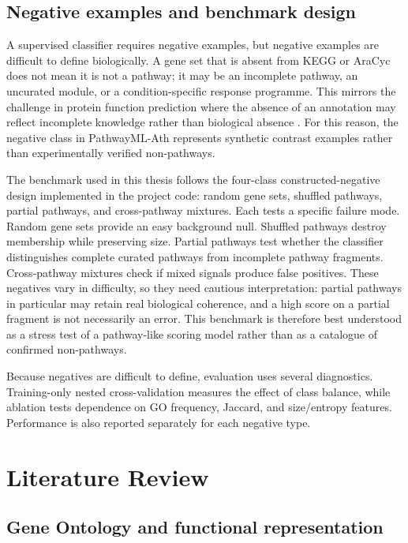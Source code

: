 \documentclass[12pt,letterpaper,oneside,openany]{book}
\begin{document}
\section{Negative examples and benchmark design}
\label{sec:bg_negatives}

A supervised classifier requires negative examples, but negative examples are difficult to define biologically. A gene set that is absent from KEGG or AraCyc does not mean it is not a pathway; it may be an incomplete pathway, an uncurated module, or a condition-specific response programme. This mirrors the challenge in protein function prediction where the absence of an annotation may reflect incomplete knowledge rather than biological absence \citep{radivojac2013community}. For this reason, the negative class in PathwayML-Ath represents synthetic contrast examples rather than experimentally verified non-pathways.

The benchmark used in this thesis follows the four-class constructed-negative design implemented in the project code: random gene sets, shuffled pathways, partial pathways, and cross-pathway mixtures. Each tests a specific failure mode. Random gene sets provide an easy background null. Shuffled pathways destroy membership while preserving size. Partial pathways test whether the classifier distinguishes complete curated pathways from incomplete pathway fragments. Cross-pathway mixtures check if mixed signals produce false positives. 
These negatives vary in difficulty, so they need cautious interpretation: partial pathways in particular may retain real biological coherence, and a high score on a partial fragment is not necessarily an error. This benchmark is therefore best understood as a stress test of a pathway-like scoring model rather than as a catalogue of confirmed non-pathways.

Because negatives are difficult to define, evaluation uses several diagnostics. Training-only nested cross-validation measures the effect of class balance, while ablation tests dependence on GO frequency, Jaccard, and size/entropy features. Performance is also reported separately for each negative type.

\chapter{Literature Review}
\label{sec:literature_review}

\section{Gene Ontology and functional representation}
\label{sec:lit_go}
\end{document}
